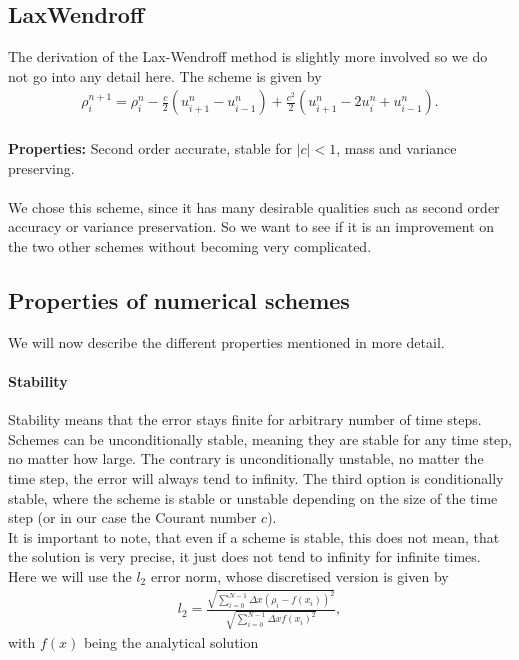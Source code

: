 \subsection{LaxWendroff}
The derivation of the Lax-Wendroff method is slightly more involved so we do not go into any detail here. The scheme is given by  \cite[p.127 f.]{lax_book}
\begin{align}
\rho_i^{n+1}=\rho_i^n - \frac c2 \left(u^n_{i+1}-u^n_{i-1}\right) +\frac{c^2}{2}\left(u_{i+1}^n-2u_i^n+u_{i-1}^n\right).
\end{align}
\\
\textbf{Properties:} Second order accurate, stable for $|c|<1$, mass and variance preserving.\cite[p.127]{lax_book} \\ \\
We chose this scheme, since it has many desirable qualities such as second order accuracy or variance preservation. So we want to see if it is an improvement on the two other schemes without becoming very complicated. 
\subsection{Properties of numerical schemes}
We will now describe the different properties mentioned in more detail.
\paragraph{Stability}
Stability means that the error stays finite for arbitrary number of time steps. Schemes can be unconditionally stable, meaning they are stable for any time step, no matter how large. The contrary is unconditionally unstable, no matter the time step, the error will always tend to infinity. The third option is conditionally stable, where the scheme is stable or unstable depending on the size of the time step (or in our case the Courant number $c$).\\
It is important to note, that even if a scheme is stable, this does not mean, that the solution is very precise, it just does not tend to infinity for infinite times. \\
Here we will use the $l_2$ error norm, whose discretised version is given by
\begin{align}
l_2 =\frac{\sqrt{ \sum_{i=0}^{N-1}\Delta x\left(\rho_i-f(x_i)\right)^2}}{\sqrt{\sum_{i=0}^{N-1}\Delta x f(x_i)^2}},
\end{align}
with $f(x)$ being the analytical solution
